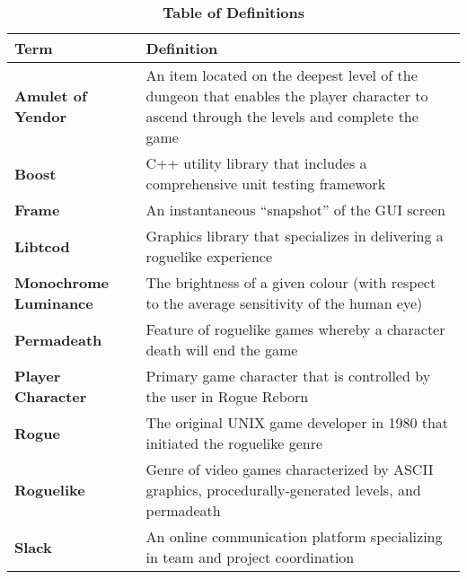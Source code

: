 \documentclass[12pt, titlepage]{article}
\begin{document}
		\begin{table}[H]
			\centering
			\caption{\textbf{Table of Definitions}}
			\label{TableDefinitions}
			\bigskip
			\begin{tabularx}{\textwidth}{p{3.5cm}X}
				\toprule
				\textbf{Term} & \textbf{Definition}\\
				\midrule
				\textbf{Amulet of Yendor} & An item located on the deepest level of the dungeon that enables the player character to ascend through the levels and complete the game\\
				\textbf{Boost} & C++ utility library that includes a comprehensive unit testing framework\\
				\textbf{Frame} & An instantaneous ``snapshot'' of the GUI screen\\
				\textbf{Libtcod} & Graphics library that specializes in delivering a roguelike experience\\
				\textbf{Monochrome Luminance} & The brightness of a given colour (with respect to the average sensitivity of the human eye)\\
				\textbf{Permadeath} & Feature of roguelike games whereby a character death will end the game\\
				\textbf{Player Character} & Primary game character that is controlled by the user in Rogue Reborn\\
				\textbf{Rogue} & The original UNIX game developer in 1980 that initiated the roguelike genre\\
				\textbf{Roguelike} & Genre of video games characterized by ASCII graphics, procedurally-generated levels, and permadeath\\
				\textbf{Slack} & An online communication platform specializing in team and project coordination\\ 
				\bottomrule
			\end{tabularx}
		\end{table}	
\end{document}
